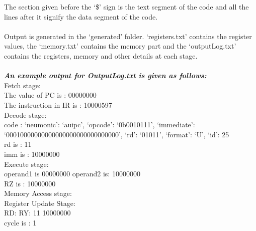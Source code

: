 \documentclass{article}
\begin{document}
The section given before the `\$' sign is the text segment of the code and all the lines after it signify the data segment of the code.\\\\
Output is generated in the `generated' folder. `registers.txt' contains the register values, the `memory.txt' contains the memory part and the `outputLog.txt' contains the registers, memory and other details at each stage. \\\\
\textsl{\textbf{ An example output for OutputLog.txt is given as follows:}}\\
Fetch stage:\\
The value of PC is : 00000000\\
The instruction in IR is : 10000597\\
Decode stage:\\
code : {`neumonic': `auipc', `opcode': `0b0010111', `immediate':\\ `00010000000000000000000000000000', `rd': `01011', `format': `U', `id': 25}\\
rd is : 11\\
imm is : 10000000\\
Execute stage:\\
operand1 is 00000000 operand2 is: 10000000\\
RZ is : 10000000\\
Memory Access stage:\\
Register Update Stage:\\
RD: RY: 11 10000000\\
cycle is : 1\\
\end{document}
